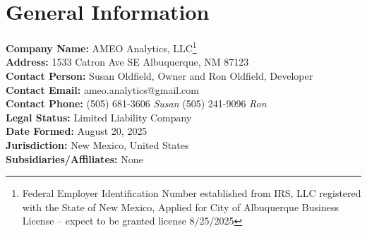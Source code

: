 \section{General Information}

\textbf{Company Name:} AMEO Analytics, LLC\footnote{Federal Employer Identification Number established from IRS, LLC registered with the State of New Mexico, Applied for City of Albuquerque Business License -- expect to be granted license 8/25/2025} \\
\textbf{Address:} 1533 Catron Ave SE Albuquerque, NM 87123 \\
\textbf{Contact Person:} Susan Oldfield, Owner and Ron Oldfield, Developer \\
\textbf{Contact Email:} ameo.analytics@gmail.com \\
\textbf{Contact Phone:} (505) 681-3606 \textit{Susan} (505) 241-9096 \textit{Ron} \\
\textbf{Legal Status:} Limited Liability Company \\
\textbf{Date Formed:} August 20, 2025 \\
\textbf{Jurisdiction:} New Mexico, United States \\
\textbf{Subsidiaries/Affiliates:} None